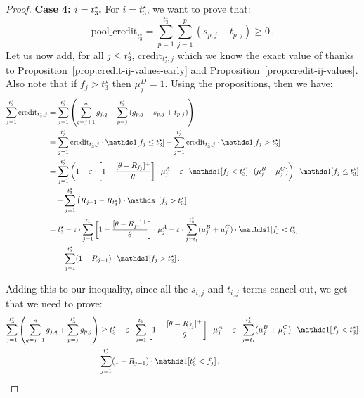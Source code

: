 \begin{proof}
    \smallskip
    \noindent\textbf{Case 4: $i=t_3^\star$.} For $i=t_3^\star$, we want to prove that:
    \begin{equation*}
        \text{pool\_credit}_{t_3^\star} = \sum_{p=1}^{t_3^\star} \sum_{j=1}^p \left(s_{p,j} - t_{p,j}\right) \geq 0\,.
    \end{equation*}
    Let us now add, for all $j\leq t_3^\star$, $\text{credit}_{t_3^\star,j}$ which we know the exact value of thanks to Proposition~\ref{prop:credit-ij-values-early} and Proposition~\ref{prop:credit-ij-values}. Also note that if $f_j > t_3^\star$ then $\mu_j^D = 1$. 
    Using the propositions, then we have:
    \begin{align*}
        \sum_{j=1}^{t_3^\star} \text{credit}_{t_3^\star,j} &= \sum_{j=1}^{t_3^\star}\Paren{ \sum_{q=j+1}^{n} g_{j,q} + \sum_{p=j}^{t_3^\star} \left(g_{p,j} - s_{p,j} + t_{p,j}\right)} \\
        &= \sum_{j=1}^{t_3^\star} \text{credit}_{t_3^\star,j} \cdot \ind[f_j \leq t_3^\star] + \sum_{j=1}^{t_3^\star} \text{credit}_{t_3^\star,j} \cdot \ind[f_j > t_3^\star]\\
        &= \sum_{j=1}^{t_3^\star} \Paren{1 - \Mcoeffmone\cdot \left[1-\frac{[\MRttwo-R_{f_j}]^+}{\MRttwo}\right] \cdot \mu_j^A - \Mcoeffmone\cdot \ind[f_j < t_3^\star] \cdot ( \mu_j^B +  \mu_j^C)} \cdot \ind[f_j \leq t_3^\star]\\
        &\quad + \sum_{j=1}^{t_3^\star} \Paren{R_{j-1} - R_{t_3^\star}} \cdot \ind[f_j > t_3^\star]\\
        &= t_3^\star - \Mcoeffmone\cdot \sum_{j=1}^{t_1} \left[1-\frac{[\MRttwo-R_{f_j}]^+}{\MRttwo}\right] \cdot \mu_j^A
         - \Mcoeffmone \cdot \sum_{j=t_1}^{t_3^\star}(\mu_j^B+\mu_j^C)\cdot \ind[f_j<t_3^\star] \\
        &\quad - \sum_{j=1}^{t_3^\star}(1-R_{j-1}) \cdot \ind[f_j > t_3^\star]\,.
    \end{align*}
    
    Adding this to our inequality, since all the $s_{i,j}$ and $t_{i,j}$ terms cancel out, we get that we need to prove:
    \begin{align*}
        \sum_{j=1}^{t_3^\star} \left(\sum_{q=j+1}^{n} g_{j,q} + \sum_{p=j}^{t_3^\star} g_{p,j} \right)&\geq t_3^\star - \Mcoeffmone\cdot \sum_{j=1}^{t_1}\left[1-\frac{[\MRttwo-R_{f_j}]^+}{\MRttwo}\right] \cdot \mu_j^A 
        - \Mcoeffmone \cdot \sum_{j=t_1}^{t_3^\star}(\mu_j^B+\mu_j^C)\cdot \ind[f_j<t_3^\star] \\
        & \- \sum_{j=1}^{t_3^\star}(1-R_{j-1}) \cdot \ind[t_3^\star<f_j]\,.
    \end{align*}
    

\end{proof}
